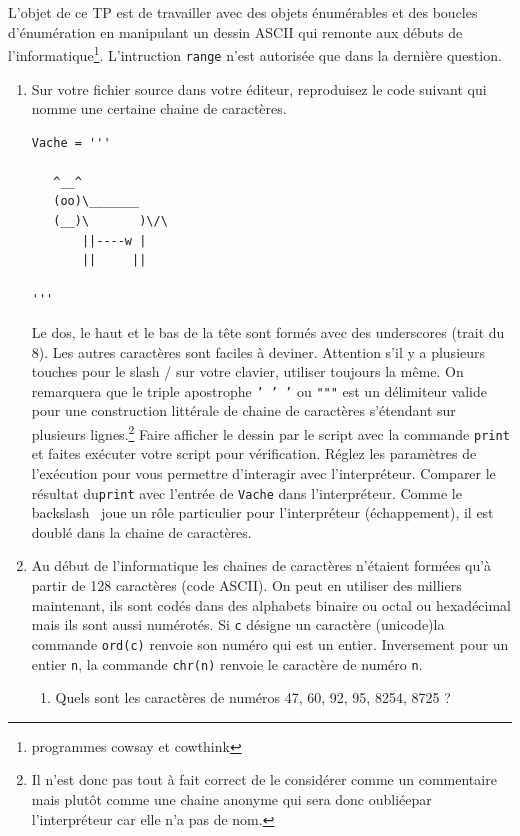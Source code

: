 L'objet de ce TP est de travailler avec des objets énumérables et des boucles d'énumération en manipulant un dessin ASCII qui remonte aux débuts de l'informatique\footnote{programmes cowsay et cowthink}. L'intruction \texttt{range} n'est autorisée que dans la dernière question.
\begin{enumerate}
 \item Sur votre fichier source dans votre éditeur, reproduisez le code suivant qui nomme une certaine chaine de caractères.
\begin{verbatim}
Vache = '''
  
   ^__^             
   (oo)\_______     
   (__)\       )\/\ 
       ||----w |    
       ||     ||    
  
'''
\end{verbatim}
Le dos, le haut et le bas de la tête sont formés avec des underscores (trait du 8). Les autres caractères sont faciles à deviner. Attention s'il y a plusieurs touches pour le slash / sur votre clavier, utiliser toujours la même.\newline 
On remarquera que le triple apostrophe \texttt{' ' '} ou \texttt{"""} est un délimiteur valide pour une construction littérale de chaine de caractères s'étendant sur plusieurs lignes.\footnote{Il n'est donc pas tout à fait correct de le considérer comme un commentaire mais plutôt comme une chaine anonyme qui sera donc \og oubliée\fg par l'interpréteur car elle n'a pas de nom.}\newline
Faire afficher le dessin par le script avec la commande \texttt{print} et faites exécuter votre script pour vérification. Réglez les paramètres de l'exécution pour vous permettre d'interagir avec l'interpréteur. Comparer le résultat du\texttt{print} avec l'entrée de \texttt{Vache} dans l'interpréteur. Comme le backslash \ joue un rôle particulier pour l'interpréteur (échappement), il est doublé dans la chaine de caractères. 
\item Au début de l'informatique les chaines de caractères n'étaient formées qu'à partir de 128 caractères (code ASCII). On peut en utiliser des milliers maintenant, ils sont codés dans des alphabets binaire ou octal ou hexadécimal mais ils sont aussi numérotés. Si \texttt{c} désigne un caractère (unicode)la commande \texttt{ord(c)} renvoie son numéro qui est un entier.  Inversement pour un entier \texttt{n}, la commande \texttt{chr(n)} renvoie le caractère de numéro \texttt{n}.
\begin{enumerate}
 \item Quels sont les caractères de numéros 47, 60, 92, 95, 8254, 8725 ?

\end{enumerate}
\end{enumerate}
